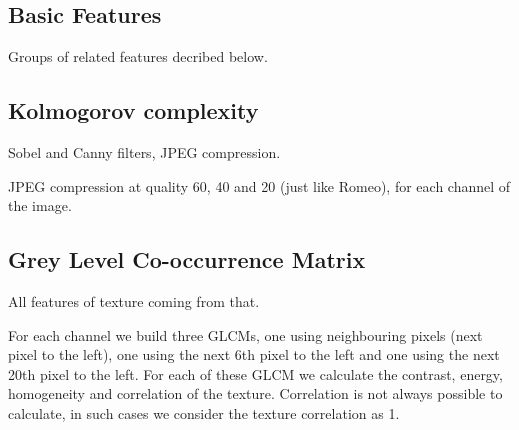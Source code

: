 \documentclass[11pt,a4paper,draft]{report}
\begin{document}
\begin{multicols}{2}
\section{Basic Features}

Groups of related features decribed below.

\subsection{Kolmogorov complexity}

Sobel and Canny filters, JPEG compression.

JPEG compression at quality 60, 40 and 20 (just like Romeo), for each channel
of the image.


\subsection{Grey Level Co-occurrence Matrix}

All features of texture coming from that.

For each channel we build three GLCMs, one using neighbouring pixels (next
pixel to the left), one using the next 6th pixel to the left and one using the
next 20th pixel to the left.  For each of these GLCM we calculate the contrast,
energy, homogeneity and correlation of the texture.  Correlation is not always
possible to calculate, in such cases we consider the texture correlation as 1.


\end{multicols}
\end{document}
